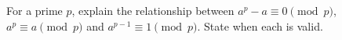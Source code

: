 For a prime $p$, explain the relationship between $a^p-a\equiv0\pmod p$, $a^p\equiv a\pmod p$ and $a^{p-1}\equiv1\pmod p$. State when each is valid.
